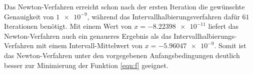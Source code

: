 Das Newton-Verfahren erreicht schon nach der ersten Iteration die gewünschte Genauigkeit von \(\num{1e-9}\), während das Intervallhalbierungsverfahren dafür \(61\) Iterationen benötigt.
Mit einem Wert von \(x = \num{-8,22398e-11}\) liefert das Newton-Verfahren auch ein genaueres Ergebnis als das Intervallhalbierungs-Verfahren mit einem Intervall-Mittelwert von \(x = \num{-5,96047e-9}\).
Somit ist das Newton-Verfahren unter den vorgegebenen Anfangsbedingungen deutlich besser zur Minimierung der Funktion \eqref{eqn:f} geeignet.
